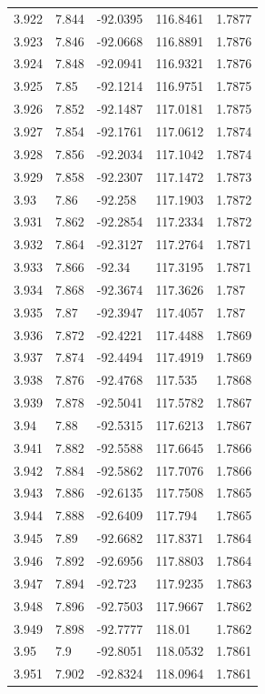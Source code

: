 \begin{tabular}{lllll}
3.922 & 7.844 & -92.0395 & 116.8461 & 1.7877 \\
3.923 & 7.846 & -92.0668 & 116.8891 & 1.7876 \\
3.924 & 7.848 & -92.0941 & 116.9321 & 1.7876 \\
3.925 & 7.85 & -92.1214 & 116.9751 & 1.7875 \\
3.926 & 7.852 & -92.1487 & 117.0181 & 1.7875 \\
3.927 & 7.854 & -92.1761 & 117.0612 & 1.7874 \\
3.928 & 7.856 & -92.2034 & 117.1042 & 1.7874 \\
3.929 & 7.858 & -92.2307 & 117.1472 & 1.7873 \\
3.93 & 7.86 & -92.258 & 117.1903 & 1.7872 \\
3.931 & 7.862 & -92.2854 & 117.2334 & 1.7872 \\
3.932 & 7.864 & -92.3127 & 117.2764 & 1.7871 \\
3.933 & 7.866 & -92.34 & 117.3195 & 1.7871 \\
3.934 & 7.868 & -92.3674 & 117.3626 & 1.787 \\
3.935 & 7.87 & -92.3947 & 117.4057 & 1.787 \\
3.936 & 7.872 & -92.4221 & 117.4488 & 1.7869 \\
3.937 & 7.874 & -92.4494 & 117.4919 & 1.7869 \\
3.938 & 7.876 & -92.4768 & 117.535 & 1.7868 \\
3.939 & 7.878 & -92.5041 & 117.5782 & 1.7867 \\
3.94 & 7.88 & -92.5315 & 117.6213 & 1.7867 \\
3.941 & 7.882 & -92.5588 & 117.6645 & 1.7866 \\
3.942 & 7.884 & -92.5862 & 117.7076 & 1.7866 \\
3.943 & 7.886 & -92.6135 & 117.7508 & 1.7865 \\
3.944 & 7.888 & -92.6409 & 117.794 & 1.7865 \\
3.945 & 7.89 & -92.6682 & 117.8371 & 1.7864 \\
3.946 & 7.892 & -92.6956 & 117.8803 & 1.7864 \\
3.947 & 7.894 & -92.723 & 117.9235 & 1.7863 \\
3.948 & 7.896 & -92.7503 & 117.9667 & 1.7862 \\
3.949 & 7.898 & -92.7777 & 118.01 & 1.7862 \\
3.95 & 7.9 & -92.8051 & 118.0532 & 1.7861 \\
3.951 & 7.902 & -92.8324 & 118.0964 & 1.7861 \\

\end{tabular}
